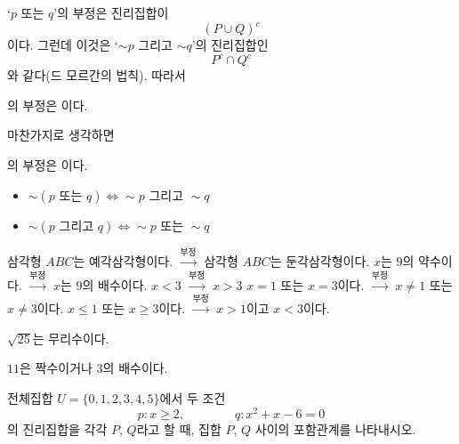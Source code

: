 \documentclass{oblivoir}
\begin{document}
\medskip
`\(p\) 또는 \(q\)’의 부정은 진리집합이
\[(P\cup Q)^c\]
이다.
그런데 이것은 `\(\sim p\) 그리고 \(\sim q\)’의 진리집합인
\[P^c\cap Q^c\]
와 같다(드 모르간의 법칙).
따라서
\begin{center}
의 부정은 이다.
\end{center}
마찬가지로 생각하면
\begin{center}
의 부정은 이다.
\end{center}
\begin{mdframed}

%
\theo{}
\begin{itemize}\label{negation6}
\item
\(\sim(p\text{ 또는 }q)\iff\sim p\text{ 그리고 }\sim q\)
\item
\(\sim(p\text{ 그리고 }q)\iff\sim p\text{ 또는 }\sim q\)
\end{itemize}
\end{mdframed}

%
\label{negation7}
\vspace{-20pt}
\tabd
{삼각형 \(ABC\)는 예각삼각형이다. \(\xrightarrow{\text{부정}}\) 삼각형 \(ABC\)는 둔각삼각형이다.}
{\(x\)는 \(9\)의 약수이다. 	\(\xrightarrow{\text{부정}}\) \(x\)는 \(9\)의 배수이다.}
{\(x<3\) 					\(\xrightarrow{\text{부정}}\) \(x>3\)}
{\(x=1\) 또는 \(x=3\)이다. 	\(\xrightarrow{\text{부정}}\)  \(x\neq1\) 또는 \(x\neq 3\)이다.}
{\(x\le1\) 또는 \(x\ge 3\)이다. 	\(\xrightarrow{\text{부정}}\) \(x>1\)이고 \(x<3\)이다.}

%
\label{negation8}
\begin{enumerate*}[itemjoin={\qquad\qquad}]
\item
\(\sqrt{25}\)는 무리수이다.
\item
\(11\)은 짝수이거나 \(3\)의 배수이다.
\end{enumerate*}

%
\prob{}\label{negation9}
전체집합 \(U=\{0,1,2,3,4,5\}\)에서 두 조건
\[p:x\ge2,\qquad\qquad q:x^2+x-6=0\]
의 진리집합을 각각 \(P\), \(Q\)라고 할 때, 집합 \(P\), \(Q\) 사이의 포함관계를 나타내시오.
\end{document}

